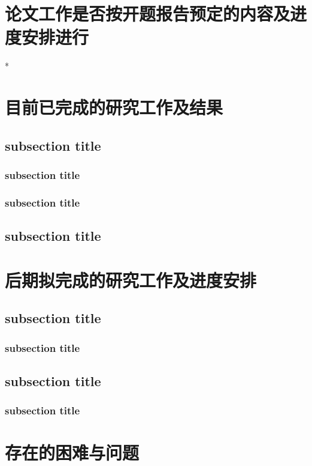 \section{论文工作是否按开题报告预定的内容及进度安排进行}*

\lipsum[1]

\section{目前已完成的研究工作及结果}

\subsection{subsection title}
\subsubsection{subsection title}
\lipsum[2-3]
\subsubsection{subsection title}
\subsection{subsection title}
\lipsum[4-5]

\section{后期拟完成的研究工作及进度安排}

\subsection{subsection title}
\subsubsection{subsection title}
\lipsum[2-3]
\subsection{subsection title}
\subsubsection{subsection title}
\lipsum[4-5]

\section{存在的困难与问题}

